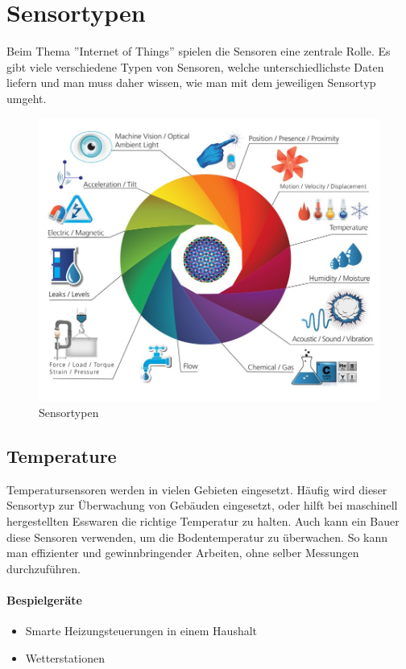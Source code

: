 \section{Sensortypen}
Beim Thema ''Internet of Things'' spielen die Sensoren eine zentrale Rolle. Es gibt viele verschiedene Typen von Sensoren, welche unterschiedlichste Daten liefern und man muss daher wissen, wie man mit dem jeweiligen Sensortyp umgeht. 
\begin{figure}[H]
\centering
\includegraphics[scale=0.35]{../02_Analyse/images/sensors.jpg}
\caption{Sensortypen\cite{SensorImage}}
\end{figure}

\subsection{Temperature}
Temperatursensoren werden in vielen Gebieten eingesetzt. Häufig wird dieser Sensortyp zur Überwachung von Gebäuden eingesetzt, oder hilft bei maschinell hergestellten Esswaren die richtige Temperatur zu halten. Auch kann ein Bauer diese Sensoren verwenden, um die Bodentemperatur zu überwachen. So kann man effizienter und gewinnbringender Arbeiten, ohne selber Messungen durchzuführen.
\paragraph{Bespielgeräte}
\begin{itemize}
\item	Smarte Heizungsteuerungen in einem Haushalt
\item	Wetterstationen
\end{itemize}


